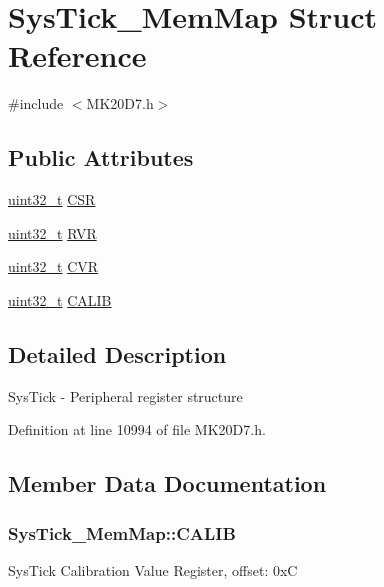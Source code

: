 \hypertarget{struct_sys_tick___mem_map}{}\section{Sys\+Tick\+\_\+\+Mem\+Map Struct Reference}
\label{struct_sys_tick___mem_map}


{\ttfamily \#include $<$M\+K20\+D7.\+h$>$}

\subsection*{Public Attributes}
\begin{DoxyCompactItemize}
\item 
\hyperlink{_p_e___types_8h_a33594304e786b158f3fb30289278f5af}{uint32\+\_\+t} \hyperlink{struct_sys_tick___mem_map_aec23689880afd46876916055403e867a}{C\+SR}
\item 
\hyperlink{_p_e___types_8h_a33594304e786b158f3fb30289278f5af}{uint32\+\_\+t} \hyperlink{struct_sys_tick___mem_map_a3f2018b492fd4bc1d141a718d499e50f}{R\+VR}
\item 
\hyperlink{_p_e___types_8h_a33594304e786b158f3fb30289278f5af}{uint32\+\_\+t} \hyperlink{struct_sys_tick___mem_map_a508dd628bc347f199e7baf4b1bfbfa0d}{C\+VR}
\item 
\hyperlink{_p_e___types_8h_a33594304e786b158f3fb30289278f5af}{uint32\+\_\+t} \hyperlink{struct_sys_tick___mem_map_a9e83c524401ad455c84d5a9738ca3d4d}{C\+A\+L\+IB}
\end{DoxyCompactItemize}


\subsection{Detailed Description}
Sys\+Tick -\/ Peripheral register structure 

Definition at line 10994 of file M\+K20\+D7.\+h.



\subsection{Member Data Documentation}
\subsubsection[{\texorpdfstring{C\+A\+L\+IB}{CALIB}}]{ Sys\+Tick\+\_\+\+Mem\+Map\+::\+C\+A\+L\+IB}\hypertarget{struct_sys_tick___mem_map_a9e83c524401ad455c84d5a9738ca3d4d}{}\label{struct_sys_tick___mem_map_a9e83c524401ad455c84d5a9738ca3d4d}
Sys\+Tick Calibration Value Register, offset\+: 0xC 

